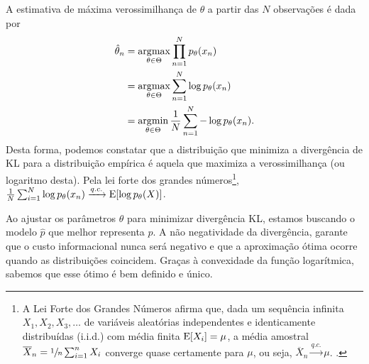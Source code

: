 A estimativa de máxima verossimilhança de $\theta$ a partir das $N$ observações é dada por
\begin{subequations}\label{eq:dvmleextm}
\begin{align}
\hat{\theta}_n &= \operatorname*{\arg\!\max}_{\theta \in \Theta} \prod_{n=1}^{N} p_\theta(x_n) \\
               &= \operatorname*{\arg\!\max}_{\theta \in \Theta} \sum_{n=1}^{N} \log p_\theta(x_n) \\
               &= \operatorname*{\arg\!\min}_{\theta \in \Theta} \frac{1}{N} \sum_{n=1}^{N} - \log p_\theta(x_n) .
\end{align}
\end{subequations}
Desta forma, podemos constatar que a distribuição que minimiza a divergência de KL para a distribuição empírica é
aquela que maximiza a verossimilhança (ou logaritmo desta).
Pela lei forte dos grandes números\footnote{
A Lei Forte dos Grandes Números afirma que, dada um sequência infinita 
$X_1, X_2, X_3, \ldots$ de variáveis aleatórias independentes e identicamente distribuídas (i.i.d.) 
com média finita $\mathrm{E}[X_i]=\mu$, a média amostral $\overline{X}_n = \sfrac{1}{n}\sum_{i=1}^{n} X_i$
converge quase certamente para $\mu$, ou seja, $\overline{X}_n \xrightarrow{q.c.} \mu$. 
.
}, $\frac{1}{N} \sum_{i=1}^{N} \log p_\theta(x_n) \xrightarrow{q.c.} \mathrm{E}[ \log p_\theta(X) ]$.

Ao ajustar os parâmetros $\theta$ para minimizar divergência KL, estamos buscando o modelo $\hat{p}$
que melhor representa $p$. A não negatividade da divergência, garante que o custo informacional 
nunca será negativo e que a aproximação ótima ocorre quando as distribuições coincidem.
Graças à convexidade da função logarítmica, sabemos que esse ótimo é bem definido e único.

